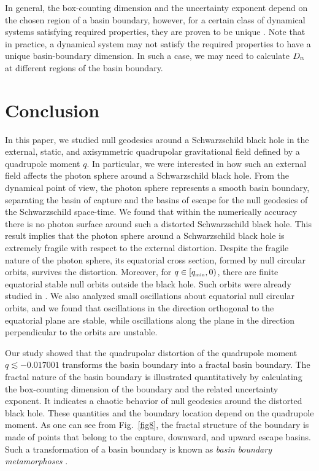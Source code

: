 \documentclass[twocolumn,showpacs,preprintnumbers,amsmath,amssymb,floatfix,nofootinbib]{revtex4-1}
\newcommand{\ind}[1]{\mbox{\tiny #1}}
\begin{document}
In general, the box-counting dimension and the uncertainty exponent depend on the chosen region of a basin boundary, however, for a certain class of dynamical systems satisfying required properties, they are proven to be unique \cite{GNOY}. Note that in practice, a dynamical system may not satisfy the required properties to have a unique basin-boundary dimension. In such a case, we may need to calculate $D_{\ind{B}}$ at different regions of the basin boundary. 

\section{Conclusion}

In this paper, we studied null geodesics around a Schwarzschild black hole in the external, static, and axisymmetric quadrupolar gravitational field defined by a quadrupole moment $q$. In particular, we were interested in how such an external field affects the photon sphere around a Schwarzschild black hole. From the dynamical point of view, the photon sphere represents a smooth basin boundary, separating the basin of capture and the basins of escape for the null geodesics of the Schwarzschild space-time. We found that within the numerically accuracy there is no photon surface around such a distorted Schwarzschild black hole. This result implies that the photon sphere around a Schwarzschild black hole is extremely fragile with respect to the external distortion. Despite the fragile nature of the photon sphere, its equatorial cross section, formed by null circular orbits, survives the distortion. Moreover, for $q\in [q_{\ind{min}},0)$, there are finite equatorial stable null orbits outside the black hole. Such orbits were already studied in \cite{Shoom:2015slu}. We also analyzed small oscillations about equatorial null circular orbits, and we found that oscillations in the direction orthogonal to the equatorial plane are stable, while oscillations along the plane in the direction perpendicular to the orbits are unstable.

Our study showed that the quadrupolar distortion of the quadrupole moment $q\lesssim-0.017001$ transforms the basin boundary into a fractal basin boundary. The fractal nature of the basin boundary is illustrated quantitatively by calculating the box-counting dimension of the boundary and the related uncertainty exponent. It indicates a chaotic behavior of null geodesics around the distorted black hole. These quantities and the boundary location depend on the quadrupole moment. As one can see from Fig.~\ref{fig8}, the fractal structure of the boundary is made of points that belong to the capture, downward, and upward escape basins. Such a transformation of a basin boundary is known as {\em basin boundary metamorphoses} \cite{Ott,GOY1,GOY2}.  
\end{document}
